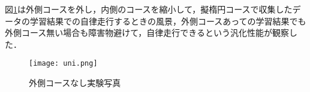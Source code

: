 図\ref{uni}は外側コースを外し，内側のコースを縮小して，擬楕円コースで収集したデータの学習結果での自律走行するときの風景，外側コースあっての学習結果でも外側コース無い場合も障害物避けて，自律走行できるという汎化性能が観察した．
\vspace{-1mm}
\begin{figure}[!ht]
    \centering
    \texttt{[image: uni.png]}
    \caption{外側コースなし実験写真}
    \label{uni}
\end{figure}

